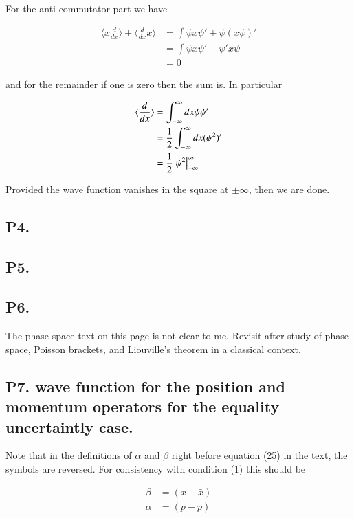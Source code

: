 \documentclass{article}
\newcommand{\expectation}[1]{\langle{#1}\rangle}
\begin{document}
For the anti-commutator part we have

\begin{align*}
\expectation{x \frac{d}{dx}} + \expectation{\frac{d}{dx} x} 
&=
\int \psi x \psi' + \psi (x \psi)' \\
&=
\int \psi x \psi' - \psi' x \psi \\
&= 0
\end{align*}

and for the remainder if one is zero then the sum is.  In particular

\begin{align*}
\expectation{\frac{d}{dx}} 
&= \int_{-\infty}^\infty dx \psi \psi' \\
&= \inv{2} \int_{-\infty}^\infty dx (\psi^2)' \\
&= \inv{2} \left. \psi^2 \right\vert_{-\infty}^\infty
\end{align*}

Provided the wave function vanishes in the square at $\pm \infty$, then we are done.

\subsection{ P4. }
\subsection{ P5. }
\subsection{ P6. }

The phase space text on this page is not clear to me.  Revisit after study
of phase space, Poisson brackets, and Liouville's theorem in a classical
context.

\subsection{ P7. wave function for the position and momentum operators for the equality uncertaintly case. }

Note that in the definitions of $\alpha$ and $\beta$ right before equation (25) in the text, the symbols are reversed.  For consistency with condition (1)
this should be

\begin{align*}
\beta &= (x - \bar{x}) \\
\alpha &= (p - \bar{p})
\end{align*}
\end{document}

